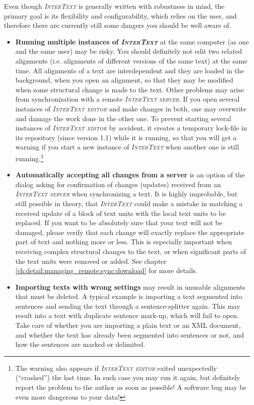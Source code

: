 \documentclass[a4paper,10pt,oneside]{book}
\newcommand{\IT}{\textit{\textsc{InterText}}\xspace}
\newcommand{\ITeditor}{\textit{\textsc{InterText editor}}\xspace}
\newcommand{\ITserver}{\textit{\textsc{InterText server}}\xspace}
\begin{document}
Even though \IT is generally written with robustness in mind, the primary goal is its flexibility and configurability, which relies on the user, and therefore there are currently still some dangers you should be well aware of.

\begin{itemize}
	\item \textbf{Running multiple instances of \IT} at the same computer (as one and the same user) may be risky. You should definitely not edit two related alignments (i.e. alignments of different versions of the same text) at the same time. All alignments of a text are interdependent and they are loaded in the background, when you open an alignment, so that they may be modified when some structural change is made to the text. Other problems may arise from synchronization with a remote \ITserver. If you open several instances of \ITeditor and make changes in both, one may overwrite and damage the work done in the other one. To prevent starting several instances of \ITeditor by accident, it creates a temporary lock-file in its repository (since version 1.1) while it is running, so that you will get a warning if you start a new instance of \IT when another one is still running.\footnote{The warning also appears if \ITeditor exited unexpectedly (``crashed'') the last time. In such case you may run it again, but definitely report the problem to the author as soon as possible! A software bug may be even more dangerous to your data!}
	\item \textbf{Automatically accepting all changes from a server} is an option of the dialog asking for confirmation of changes (updates) received from an \ITserver when synchronizing a text. It is highly improbable, but still possible in theory, that \IT could make a mistake in matching a received update of a block of text units with the local text units to be replaced. If you want to be absolutely sure that your text will not be damaged, please verify that each change will exactly replace the appropriate part of text and nothing more or less. This is especially important when receiving complex structural changes to the text, or when significant parts of the text units were removed or added. See chapter \ref{ch:detail:managing_remote:sync:download} for more details.
	\item \textbf{Importing texts with wrong settings} may result in unusable alignments that must be deleted. A typical example is importing a text segmented into sentences and sending the text through a sentence-splitter again. This may result into a text with duplicate sentence mark-up, which will fail to open. Take care of whether you are importing a plain text or an XML document, and whether the text has already been segmented into sentences or not, and how the sentences are marked or delimited.
\end{itemize}
\end{document}
